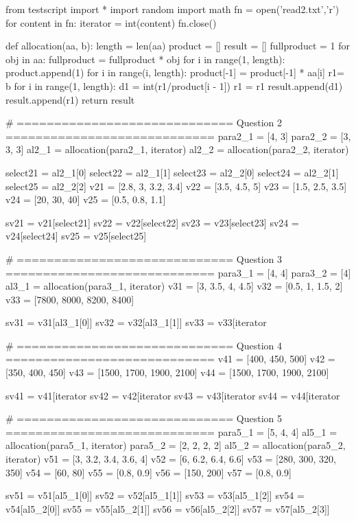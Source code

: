 \documentclass[a4paper,11pt]{article}
\begin{document}
\begin{pycode}
	from testscript import *
	import random
	import math
	fn = open('read2.txt','r')
	for content in fn:
		iterator = int(content)
	fn.close()
	
	def allocation(aa, b):
		length = len(aa)
		product = []
		result = []
		fullproduct = 1
		for obj in aa:
			fullproduct = fullproduct * obj
		for i in range(1, length):
			product.append(1)
			for i in range(i, length):
				product[-1] = product[-1] * aa[i]
		r1= b%
		for i in range(1, length):
			d1 = int(r1/product[i - 1])
			r1 = r1%
			result.append(d1)
		result.append(r1)
		return result
	
	# ============================= Question 2 ============================
	para2_1 = [4, 3]
	para2_2 = [3, 3, 3]
	al2_1 = allocation(para2_1, iterator)
	al2_2 = allocation(para2_2, iterator)
		
	select21 = al2_1[0]
	select22 = al2_1[1]
	select23 = al2_2[0]
	select24 = al2_2[1]
	select25 = al2_2[2]
	v21 = [2.8, 3, 3.2, 3.4]
	v22 = [3.5, 4.5, 5]
	v23 = [1.5, 2.5, 3.5]
	v24 = [20, 30, 40]
	v25 = [0.5, 0.8, 1.1]
	
	sv21 = v21[select21]
	sv22 = v22[select22]
	sv23 = v23[select23]
	sv24 = v24[select24]
	sv25 = v25[select25]
	
	# ============================= Question 3 ============================
	para3_1 = [4, 4]
	para3_2 = [4]
	al3_1 = allocation(para3_1, iterator)
	v31 = [3, 3.5, 4, 4.5]
	v32 = [0.5, 1, 1.5, 2]
	v33 = [7800, 8000, 8200, 8400]
	
	sv31 = v31[al3_1[0]]
	sv32 = v32[al3_1[1]]
	sv33 = v33[iterator%
	
	# ============================= Question 4 ============================
	v41 = [400, 450, 500]
	v42 = [350, 400, 450]
	v43 = [1500, 1700, 1900, 2100]
	v44 = [1500, 1700, 1900, 2100]
	
	sv41 = v41[iterator%
	sv42 = v42[iterator%
	sv43 = v43[iterator%
	sv44 = v44[iterator%
	
	# ============================= Question 5 ============================
	para5_1 = [5, 4, 4]
	al5_1 = allocation(para5_1, iterator)
	para5_2 = [2, 2, 2, 2]
	al5_2 = allocation(para5_2, iterator)
	v51 = [3, 3.2, 3.4, 3.6, 4]
	v52 = [6, 6.2, 6.4, 6.6]
	v53 = [280, 300, 320, 350]
	v54 = [60, 80]
	v55 = [0.8, 0.9]
	v56 = [150, 200]
	v57 = [0.8, 0.9]
	
	sv51 = v51[al5_1[0]]
	sv52 = v52[al5_1[1]]
	sv53 = v53[al5_1[2]]
	sv54 = v54[al5_2[0]]
	sv55 = v55[al5_2[1]]
	sv56 = v56[al5_2[2]]
	sv57 = v57[al5_2[3]]
	

\end{pycode}
\end{document}
